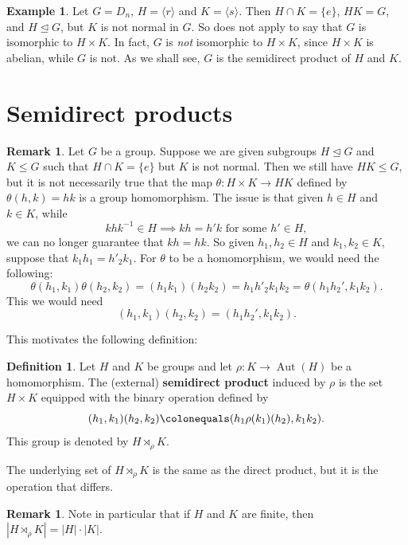 \documentclass[12pt]{report}
\numberwithin{equation}{section}
\numberwithin{theorem}{chapter}
\theoremstyle{definition}
\newtheorem{definition}[theorem]{Definition}
\newtheorem{example}[theorem]{Example}
\newtheorem*{basic properties}{Basic Properties}
\newtheorem*{Important Remark}{Important Remark}
\newtheorem{remark}[theorem]{Remark}
\newcommand{\df}[1]{{\bf #1}\index{#1}}
\def\sdp{\rtimes}
\DeclareMathOperator{\Aut}{Aut}
\def\norm{\mathrel{\unlhd}}
\begin{document}
\begin{example}\label{D_n not a direct product}
Let $G = D_{n}$, $H = \langle r \rangle$ and $K = \langle s \rangle$. Then $H \cap K = \{e \}$, $HK = G$, and $H \norm G$, but $K$ is not normal in $G$.
So  does not apply to say that $G$ is isomorphic to $H \times K$. In fact, $G$ is \emph{not} isomorphic to $H \times K$, since $H \times K$ is abelian, while $G$ is not. As we shall see, $G$ is the semidirect product of $H$ and $K$. 	
\end{example}


\section{Semidirect products}

\begin{remark}
Let $G$ be a group. Suppose we are given subgroups $H\norm G$ and $K\leq G$ such that $H\cap K=\{e\}$ but $K$ is not normal. Then we still have $HK \leq G$, but it is not necessarily true that the map $\theta: H \times K \to HK$ defined by $\theta(h,k) = hk$ is a group homomorphism. The issue is that given $h \in H$ and $k \in K$, while
$$khk^{-1} \in H \implies kh = h'k \textrm{ for some } h' \in H,$$
we can no longer guarantee that $kh=hk$. 
So given $h_1, h_2 \in H$ and $k_1, k_2 \in K$, suppose that $k_1h_1 = h'_2k_1$.
For $\theta$ to be a homomorphism, we would need the following:
$$\theta(h_1, k_1) \theta(h_2, k_2) = (h_1k_1)(h_2k_2) = h_1h'_2k_1k_2=\theta(h_1h_2',k_1k_2).$$
This we would need  
$$(h_1, k_1)(h_2, k_2)=(h_1h_2',k_1k_2).$$
\end{remark}

This motivates the following definition:


\begin{definition}
 Let $H$ and $K$ be groups and let $\rho\!: K \to \Aut(H)$ be a homomorphism. The (external) \df{semidirect product} induced by $\rho$ is the set $H \times K$ equipped with the binary operation defined by 
 $$(h_1,k_1)(h_2,k_2) \colonequals (h_1\rho(k_1)(h_2),k_1k_2).$$
 This group is denoted by $H \sdp_\rho K$.
 \end{definition}
 
The underlying set of $H \sdp_\rho K$ is the same as the direct product, but it is the operation that differs.
 
\begin{remark}
Note in particular that if $H$ and $K$ are finite, then $|H \sdp_\rho K| = |H| \cdot |K|$.
\end{remark}
 
\end{document}
